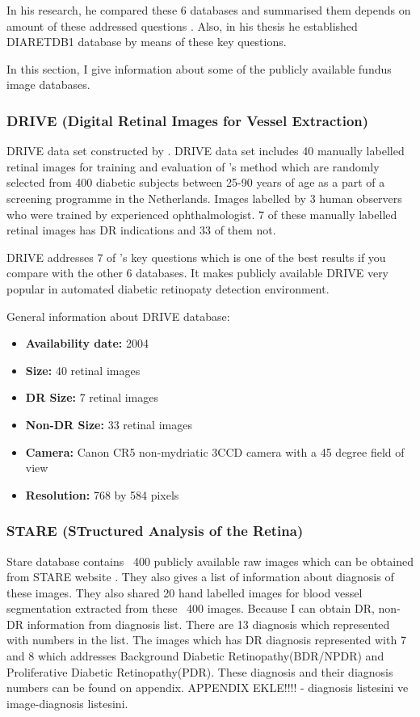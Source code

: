 In his research, he compared these 6 databases and summarised them depends on amount of these addressed questions \citep{kauppi2013constructing}. Also, in his thesis he established DIARETDB1 database by means of these key questions.

In this section, I give information about some of the publicly available fundus image databases.

\subsubsection{DRIVE (Digital Retinal Images for Vessel Extraction)}
DRIVE data set constructed by \citet{staal2004ridge}.
DRIVE data set includes 40 manually labelled retinal images for training and evaluation of \citet{staal2004ridge}'s method which are randomly selected from 400 diabetic subjects between 25-90 years of age as a part of a screening programme in the Netherlands. Images labelled by 3 human observers who were trained by experienced ophthalmologist. 7 of these manually labelled retinal images has DR indications and 33 of them not. 

DRIVE addresses 7 of \citet{kauppi2013constructing}'s key questions which is one of the best results if you compare with the other 6 databases. It makes publicly available DRIVE very popular in automated diabetic retinopaty detection environment.

General information about DRIVE database:
\begin{itemize}
    \item \textbf{Availability date: } 2004
    \item \textbf{Size: } 40 retinal images
    \item \textbf{DR Size: } 7 retinal images
    \item \textbf{Non-DR Size: } 33 retinal images
    \item \textbf{Camera: } Canon CR5 non-mydriatic 3CCD camera with a 45 degree field of view
    \item \textbf{Resolution: } 768 by 584 pixels
\end{itemize}

\subsubsection{STARE (STructured Analysis of the Retina)}
Stare database contains ~400 publicly available raw images which can be obtained from STARE website \citep{STARE}. They also gives a list of information about diagnosis of these images. They also shared 20 hand labelled images for blood vessel segmentation \citep{hoover2000locating} extracted from these ~400 images. Because I can obtain DR, non-DR information from diagnosis list. There are 13 diagnosis which represented with numbers in the list. The images which has DR diagnosis represented with 7 and 8 which addresses Background Diabetic Retinopathy(BDR/NPDR) and Proliferative Diabetic Retinopathy(PDR). These diagnosis and their diagnosis numbers can be found on appendix. {APPENDIX EKLE!!!!} - diagnosis listesini ve image-diagnosis listesini.

